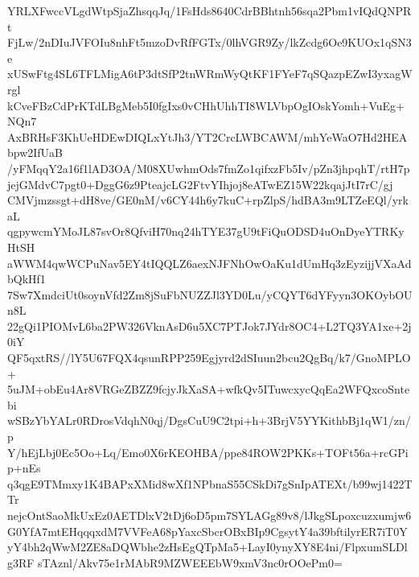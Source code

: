YRLXFwccVLgdWtpSjaZhsqqJq/1FsHds8640CdrBBhtnh56sqa2Pbm1vIQdQNPRt
FjLw/2nDIuJVFOIu8nhFt5mzoDvRfFGTx/0lhVGR9Zy/lkZcdg6Oe9KUOx1qSN3e
xUSwFtg4SL6TFLMigA6tP3dtSfP2tnWRmWyQtKF1FYeF7qSQazpEZwI3yxagWrgl
kCveFBzCdPrKTdLBgMeb5I0fgIxs0vCHhUhhTI8WLVbpOgIOskYomh+VuEg+NQn7
AxBRHsF3KhUeHDEwDIQLxYtJh3/YT2CrcLWBCAWM/mhYeWaO7Hd2HEAbpw2IfUaB
/yFMqqY2a16f1lAD3OA/M08XUwhmOds7fmZo1qifxzFb5Iv/pZn3jhpqhT/rtH7p
jejGMdvC7pgt0+DggG6z9PteajcLG2FtvYIhjoj8eATwEZ15W22kqajJtI7rC/gj
CMVjmzssgt+dH8ve/GE0nM/v6CY44h6y7kuC+rpZlpS/hdBA3m9LTZeEQl/yrkaL
qgpywcmYMoJL87svOr8QfviH70nq24hTYE37gU9tFiQuODSD4uOnDyeYTRKyHtSH
aWWM4qwWCPuNav5EY4tIQQLZ6aexNJFNhOwOaKu1dUmHq3zEyzijjVXaAdbQkHf1
7Sw7XmdciUt0soynVfd2Zm8jSuFbNUZZJl3YD0Lu/yCQYT6dYFyyn3OKOybOUn8L
22gQi1PIOMvL6ba2PW326VknAsD6u5XC7PTJok7JYdr8OC4+L2TQ3YA1xe+2j0iY
QF5qxtRS//lY5U67FQX4qsunRPP259Egjyrd2dSIuun2bcu2QgBq/k7/GnoMPLO+
5uJM+obEu4Ar8VRGeZBZZ9fcjyJkXaSA+wfkQv5ITuwcxycQqEa2WFQxcoSntebi
wSBzYbYALr0RDrosVdqhN0qj/DgsCuU9C2tpi+h+3BrjV5YYKithbBj1qW1/zn/p
Y/hEjLbj0Ec5Oo+Lq/Emo0X6rKEOHBA/ppe84ROW2PKKs+TOFt56a+rcGPip+nEs
q3qgE9TMmxy1K4BAPxXMid8wXf1NPbnaS55CSkDi7gSnIpATEXt/b99wj1422TTr
nejcOntSaoMkUxEz0AETDlxV2tDj6oD5pm7SYLAGg89v8/lJkgSLpoxcuzxumjw6
G0YfA7mtEHqqqxdM7VVFeA68pYaxcSbcrOBxBIp9CgsytY4a39bftilyrER7iT0Y
yY4bh2qWwM2ZE8aDQWbhe2zHsEgQTpMa5+LayI0ynyXY8E4ni/FlpxumSLDlg3RF
sTAznl/Akv75e1rMAbR9MZWEEEbW9xmV3nc0rOOePm0=
